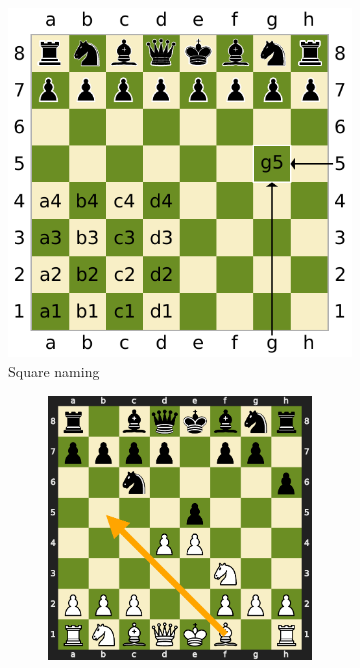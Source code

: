 \begin{figure}
\begin{subfigure}{0.3\textwidth}
   \includegraphics[width=\linewidth]{figures/algebraic_notation.pdf}
   \caption{Square naming} \label{fig:algebraic_notation}
\end{subfigure}
\hspace*{\fill}
\begin{subfigure}{0.63\textwidth}
\begin{subfigure}{0.43\textwidth}
   \vspace{.2in}\includegraphics[width=\linewidth]{figures/board_prev.pdf}

\end{subfigure}
\end{subfigure}
\end{figure}

